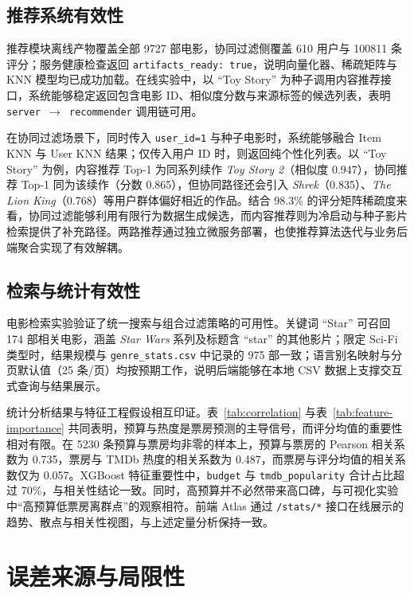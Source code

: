 \subsection{推荐系统有效性}

推荐模块离线产物覆盖全部 9727 部电影，协同过滤侧覆盖 610 用户与 100811 条评分；服务健康检查返回 \texttt{artifacts\_ready: true}，说明向量化器、稀疏矩阵与 KNN 模型均已成功加载。在线实验中，以 ``Toy Story'' 为种子调用内容推荐接口，系统能够稳定返回包含电影 ID、相似度分数与来源标签的候选列表，表明 \texttt{server $\rightarrow$ recommender} 调用链可用。

在协同过滤场景下，同时传入 \texttt{user\_id=1} 与种子电影时，系统能够融合 Item KNN 与 User KNN 结果；仅传入用户 ID 时，则返回纯个性化列表。以 ``Toy Story'' 为例，内容推荐 Top-1 为同系列续作 \textit{Toy Story 2}（相似度 0.947），协同推荐 Top-1 同为该续作（分数 0.865），但协同路径还会引入 \textit{Shrek}（0.835）、\textit{The Lion King}（0.768）等用户群体偏好相近的作品。结合 98.3\% 的评分矩阵稀疏度来看，协同过滤能够利用有限行为数据生成候选，而内容推荐则为冷启动与种子影片检索提供了补充路径。两路推荐通过独立微服务部署，也使推荐算法迭代与业务后端聚合实现了有效解耦。

\subsection{检索与统计有效性}

电影检索实验验证了统一搜索与组合过滤策略的可用性。关键词 ``Star'' 可召回 174 部相关电影，涵盖 \textit{Star Wars} 系列及标题含 ``star'' 的其他影片；限定 Sci-Fi 类型时，结果规模与 \texttt{genre\_stats.csv} 中记录的 975 部一致；语言别名映射与分页默认值（25 条/页）均按预期工作，说明后端能够在本地 CSV 数据上支撑交互式查询与结果展示。

统计分析结果与特征工程假设相互印证。表~\ref{tab:correlation} 与表~\ref{tab:feature-importance} 共同表明，预算与热度是票房预测的主导信号，而评分均值的重要性相对有限。在 5230 条预算与票房均非零的样本上，预算与票房的 Pearson 相关系数为 0.735，票房与 TMDb 热度的相关系数为 0.487，而票房与评分均值的相关系数仅为 0.057。XGBoost 特征重要性中，\texttt{budget} 与 \texttt{tmdb\_popularity} 合计占比超过 70\%，与相关性结论一致。同时，高预算并不必然带来高口碑，与可视化实验中“高预算低票房离群点”的观察相符。前端 Atlas 通过 \texttt{/stats/*} 接口在线展示的趋势、散点与相关性视图，与上述定量分析保持一致。

\section{误差来源与局限性}
\label{sec:discussion:limitations}

